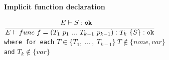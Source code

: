 \textbf{Implicit function declaration}\\
\begin{center}
	\begin{math}
		\cfrac
		{E\vdash S : \texttt{ok}\quad}
		{E \vdash func\ f = (T_1\ p_1\
		.
		.
		.
		\ T_{k-1}\ p_{k-1}): T_k\ \{ S \} : \texttt{ok}}
	\end{math}
	\\[1\baselineskip]
	\texttt{where for each} $T \in \{T_1,\ .
	.
	.
	\ ,\ T_{k-1}\}\ T \notin \{none, var\}$\\
	\texttt{and} $T_k \notin \{var\}$
\end{center}


